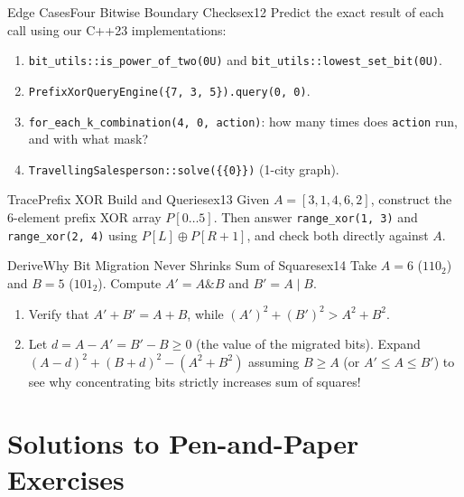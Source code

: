 \documentclass[11pt,a4paper]{article}
\theoremstyle{definition}
\begin{document}
\begin{tryitbox}{Edge Cases}{Four Bitwise Boundary Checks}{ex12}
Predict the exact result of each call using our C++23 implementations:
\begin{enumerate}[itemsep=1pt, topsep=2pt]
    \item \texttt{bit\_utils::is\_power\_of\_two(0U)} and \texttt{bit\_utils::lowest\_set\_bit(0U)}.
    \item \texttt{PrefixXorQueryEngine(\{7, 3, 5\}).query(0, 0)}.
    \item \texttt{for\_each\_k\_combination(4, 0, action)}: how many times does \texttt{action} run, and with what mask?
    \item \texttt{TravellingSalesperson::solve(\{\{0\}\})} (1-city graph).
\end{enumerate}
\end{tryitbox}

\begin{tryitbox}{Trace}{Prefix XOR Build and Queries}{ex13}
Given $A = [3, 1, 4, 6, 2]$, construct the 6-element prefix XOR array $P[0 \dots 5]$. Then answer \texttt{range\_xor(1, 3)} and \texttt{range\_xor(2, 4)} using $P[L] \oplus P[R+1]$, and check both directly against $A$.
\end{tryitbox}

\begin{tryitbox}{Derive}{Why Bit Migration Never Shrinks Sum of Squares}{ex14}
Take $A = 6$ ($110_2$) and $B = 5$ ($101_2$). Compute $A' = A \mathbin{\&} B$ and $B' = A \mid B$.
\begin{enumerate}[itemsep=1pt, topsep=2pt]
    \item Verify that $A' + B' = A + B$, while $(A')^2 + (B')^2 > A^2 + B^2$.
    \item Let $d = A - A' = B' - B \ge 0$ (the value of the migrated bits). Expand $(A - d)^2 + (B + d)^2 - (A^2 + B^2)$ assuming $B \ge A$ (or $A' \le A \le B'$) to see why concentrating bits strictly increases sum of squares!
\end{enumerate}
\end{tryitbox}

\section*{Solutions to Pen-and-Paper Exercises}
\end{document}
